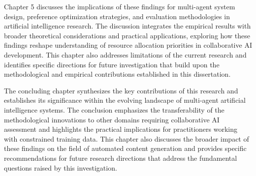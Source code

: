 Chapter 5 discusses the implications of these findings for multi-agent system design, preference optimization strategies, and evaluation methodologies in artificial intelligence research. The discussion integrates the empirical results with broader theoretical considerations and practical applications, exploring how these findings reshape understanding of resource allocation priorities in collaborative AI development. This chapter also addresses limitations of the current research and identifies specific directions for future investigation that build upon the methodological and empirical contributions established in this dissertation.

The concluding chapter synthesizes the key contributions of this research and establishes its significance within the evolving landscape of multi-agent artificial intelligence systems. The conclusion emphasizes the transferability of the methodological innovations to other domains requiring collaborative AI assessment and highlights the practical implications for practitioners working with constrained training data. This chapter also discusses the broader impact of these findings on the field of automated content generation and provides specific recommendations for future research directions that address the fundamental questions raised by this investigation.
